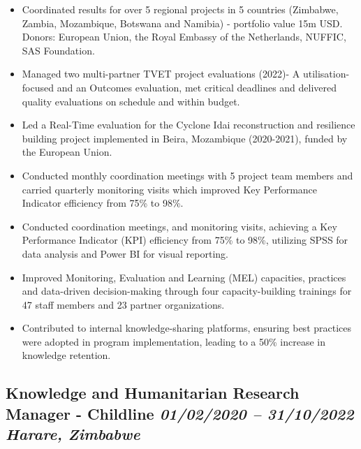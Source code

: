 \documentclass[
  10pt,
]{article}
\providecommand{\tightlist}{%
  \setlength{\itemsep}{0pt}\setlength{\parskip}{0pt}}
\begin{document}
\begin{itemize}
\tightlist
\item
  Coordinated results for over 5 regional projects in 5 countries
  (Zimbabwe, Zambia, Mozambique, Botswana and Namibia) - portfolio value
  15m USD. Donors: European Union, the Royal Embassy of the Netherlands,
  NUFFIC, SAS Foundation.
\item
  Managed two multi-partner TVET project evaluations (2022)- A
  utilisation-focused and an Outcomes evaluation, met critical deadlines
  and delivered quality evaluations on schedule and within budget.
\item
  Led a Real-Time evaluation for the Cyclone Idai reconstruction and
  resilience building project implemented in Beira, Mozambique
  (2020-2021), funded by the European Union.
\item
  Conducted monthly coordination meetings with 5 project team members
  and carried quarterly monitoring visits which improved Key Performance
  Indicator efficiency from 75\% to 98\%.
\item
  Conducted coordination meetings, and monitoring visits, achieving a
  Key Performance Indicator (KPI) efficiency from 75\% to 98\%,
  utilizing SPSS for data analysis and Power BI for visual reporting.
\item
  Improved Monitoring, Evaluation and Learning (MEL) capacities,
  practices and data-driven decision-making through four
  capacity-building trainings for 47 staff members and 23 partner
  organizations.
\item
  Contributed to internal knowledge-sharing platforms, ensuring best
  practices were adopted in program implementation, leading to a 50\%
  increase in knowledge retention.
\end{itemize}

\subsection{\texorpdfstring{Knowledge and Humanitarian Research Manager
- Childline \emph{01/02/2020 -- 31/10/2022} \textbar{} \emph{Harare,
Zimbabwe}}{Knowledge and Humanitarian Research Manager - Childline 01/02/2020 -- 31/10/2022 \textbar{} Harare, Zimbabwe}}\label{knowledge-and-humanitarian-research-manager---childline-01022020-31102022-harare-zimbabwe}
\end{document}
